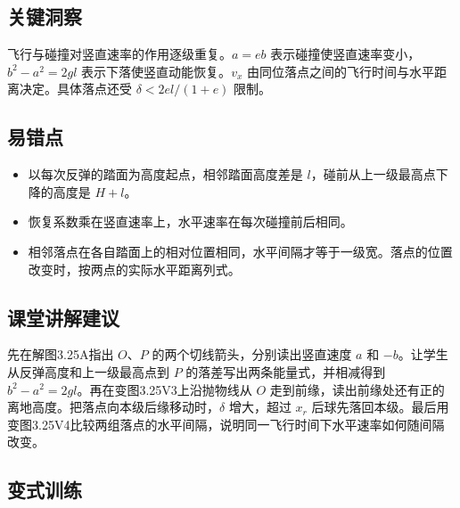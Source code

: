 \documentclass[UTF8,fontset=fandol,a4paper,11pt]{ctexart}
\begin{document}


\subsection*{关键洞察}

飞行与碰撞对竖直速率的作用逐级重复。$a=eb$ 表示碰撞使竖直速率变小，$b^2-a^2=2gl$ 表示下落使竖直动能恢复。$v_x$ 由同位落点之间的飞行时间与水平距离决定。具体落点还受 $\delta<2el/(1+e)$ 限制。



\subsection*{易错点}

\begin{itemize}
\item 以每次反弹的踏面为高度起点，相邻踏面高度差是 $l$，碰前从上一级最高点下降的高度是 $H+l$。
\item 恢复系数乘在竖直速率上，水平速率在每次碰撞前后相同。
\item 相邻落点在各自踏面上的相对位置相同，水平间隔才等于一级宽。落点的位置改变时，按两点的实际水平距离列式。
\end{itemize}



\subsection*{课堂讲解建议}

先在解图3.25A指出 $O$、$P$ 的两个切线箭头，分别读出竖直速度 $a$ 和 $-b$。让学生从反弹高度和上一级最高点到 $P$ 的落差写出两条能量式，并相减得到 $b^2-a^2=2gl$。再在变图3.25V3上沿抛物线从 $O$ 走到前缘，读出前缘处还有正的离地高度。把落点向本级后缘移动时，$\delta$ 增大，超过 $x_r$ 后球先落回本级。最后用变图3.25V4比较两组落点的水平间隔，说明同一飞行时间下水平速率如何随间隔改变。



\subsection*{变式训练}
\end{document}
